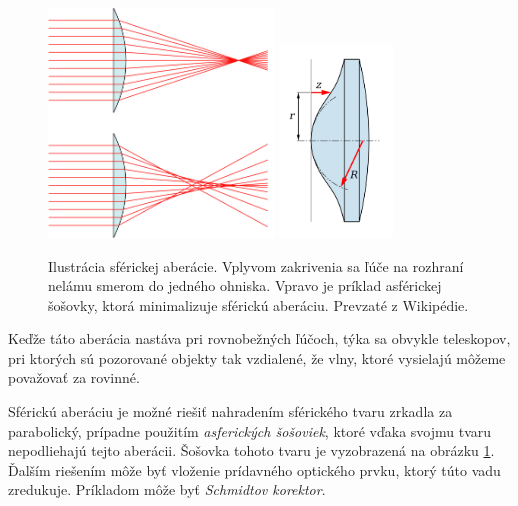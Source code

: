 \begin{figure}[h]
\centering
\label{saill}
\includegraphics[width=6cm]{obrazky-figures/sphericalAberrationWikipedia.png}
\includegraphics[width=3cm]{obrazky-figures/asphericLen.png}
\caption{Ilustrácia sférickej aberácie. Vplyvom zakrivenia sa ľúče na rozhraní nelámu smerom
    do jedného ohniska. Vpravo je príklad asférickej šošovky, ktorá minimalizuje sférickú aberáciu. Prevzaté z Wikipédie\cite{sphericalAberrationWiki}.}
\end{figure}

Keďže táto aberácia nastáva pri rovnobežných ľúčoch, týka sa obvykle teleskopov, pri ktorých
sú pozorované objekty tak vzdialené, že vlny, ktoré vysielajú môžeme považovať za rovinné.

Sférickú aberáciu je možné riešiť nahradením sférického tvaru zrkadla za parabolický,
prípadne použitím \textit{asferických šošoviek}, ktoré vďaka svojmu tvaru nepodliehajú tejto
aberácii. Šošovka tohoto tvaru je vyzobrazená na obrázku \ref{saill}. Ďalším riešením
môže byť vloženie prídavného optického prvku, ktorý túto vadu zredukuje. Príkladom môže
byť \textit{Schmidtov korektor}.

